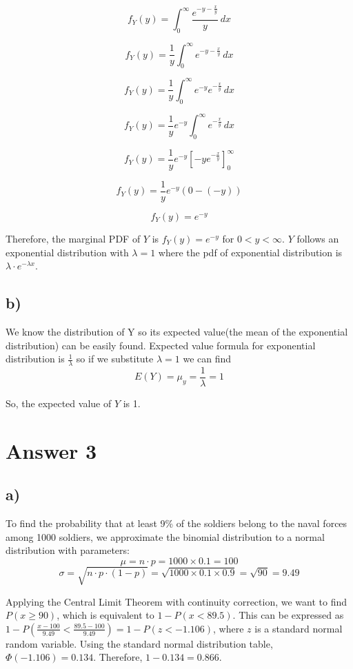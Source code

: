 \documentclass[12pt]{article}
\begin{document}
\[ f_{Y}(y) = \int_{0}^{\infty} \frac{e^{-y - \frac{x}{y}}}{y} \, dx \]

\[ f_{Y}(y) = \frac{1}{y} \int_{0}^{\infty} e^{-y - \frac{x}{y}} \, dx \]

\[ f_{Y}(y) = \frac{1}{y} \int_{0}^{\infty} e^{-y} e^{-\frac{x}{y}} \, dx \]

\[ f_{Y}(y) = \frac{1}{y} e^{-y} \int_{0}^{\infty} e^{-\frac{x}{y}} \, dx \]

\[ f_{Y}(y) = \frac{1}{y} e^{-y} \left[ -y e^{-\frac{x}{y}} \right]_{0}^{\infty} \]

\[ f_{Y}(y) = \frac{1}{y} e^{-y} \left( 0 - (-y) \right) \]

\[ f_{Y}(y) = e^{-y} \]

Therefore, the marginal PDF of \( Y \) is \( f_{Y}(y) = e^{-y} \) for \( 0 < y < \infty \). \( Y \) follows an exponential distribution with \( \lambda = 1 \)  where  the pdf of exponential distribution is \( \lambda \cdot e^{-\lambda x} \).

\subsection*{b)} 

We know the distribution of Y so its expected value(the mean of the exponential distribution) can be easily found. Expected value formula for exponential distribution is \(\frac{1}{\lambda} \) so if we substitute \( \lambda = 1 \) we can find \[ E(Y) = \mu_y = \frac{1}{\lambda} = 1 \]  


So, the expected value of \( Y \) is 1.


\section*{Answer 3}
\subsection*{a)} 
 To find the probability that at least 9\% of the soldiers belong to the naval forces among 1000 soldiers, we approximate the binomial distribution to a normal distribution with parameters:
\[
\mu = n\cdot p = 1000 \times 0.1 = 100
\]
\[
\sigma =\sqrt{ n\cdot p\cdot (1 - p) } =  \sqrt{1000 \times 0.1 \times 0.9} = \sqrt{90} = 9.49
\]

Applying the Central Limit Theorem with continuity correction, we want to find \(P(x \geq 90)\), which is equivalent to \(1 - P(x < 89.5)\). This can be expressed as \(1 - P\left(\frac{x - 100}{9.49} < \frac{89.5 - 100}{9.49}\right) = 1 - P(z < -1.106)\), where \(z\) is a standard normal random variable. Using the standard normal distribution table, \(\Phi(-1.106) = 0.134\). Therefore, \(1 - 0.134 = 0.866\).
\end{document}
